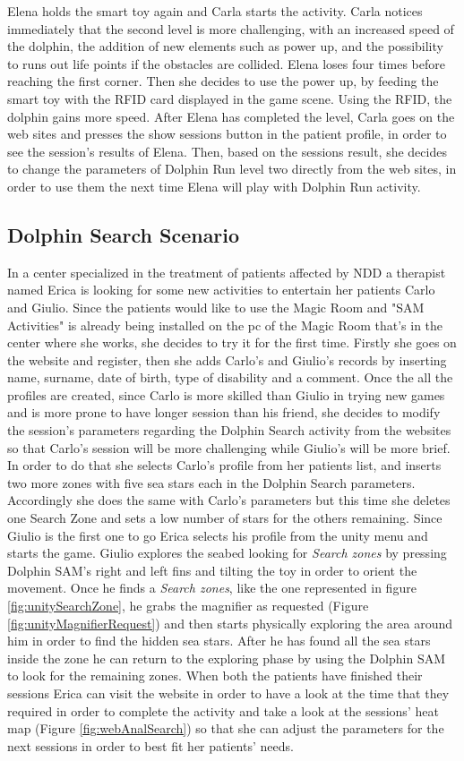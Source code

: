 Elena holds the smart toy again and Carla starts the activity. Carla notices immediately that the second level is more challenging, with an increased speed of the dolphin, the addition of new elements such as power up, and the possibility to runs out life points if the obstacles are collided. Elena loses four times before reaching the first corner. Then she decides to use the power up, by feeding the smart toy with the RFID card displayed in the game scene. Using the RFID, the dolphin gains more speed.
After Elena has completed the level, Carla goes on the web sites and presses the show sessions button in the patient profile, in order to see the session's results of Elena. Then, based on the sessions result, she decides to change the parameters of Dolphin Run level two directly from the web sites, in order to use them the next time Elena will play with Dolphin Run activity.

\subsection{Dolphin Search Scenario}
In a center specialized in the treatment of patients affected by NDD a therapist named Erica is looking for some new activities to entertain her patients Carlo and Giulio.
Since the patients would like to use the Magic Room and "SAM Activities" is already being installed on the pc of the Magic Room that's in the center where she works, she decides to try it for the first time.
Firstly she goes on the website and register, then she adds Carlo's and Giulio's records by inserting name, surname, date of birth, type of disability and a comment.
Once the all the profiles are created, since Carlo is more skilled than Giulio in trying new games and is more prone to have longer session than his friend, she decides to modify the session's parameters regarding the Dolphin Search activity from the websites so that Carlo's session will be more challenging while Giulio's will be more brief. In order to do that she selects Carlo's profile from her patients list, and inserts two more zones with five sea stars each in the Dolphin Search parameters. Accordingly she does the same with Carlo's parameters but this time she deletes one Search Zone and sets a low number of stars for the others remaining.
Since Giulio is the first one to go Erica selects his profile from the unity menu and starts the game.
Giulio explores the seabed looking for \textit{Search zones} by pressing Dolphin SAM's right and left fins and tilting the toy in order to orient the movement. Once he finds a \textit{Search zones}, like the one represented in figure \ref{fig:unitySearchZone}, he grabs the magnifier as requested (Figure \ref{fig:unityMagnifierRequest}) and then starts physically exploring the area around him in order to find the hidden sea stars. After he has found all the sea stars inside the zone he can return to the exploring phase by using the Dolphin SAM to look for the remaining zones.
When both the patients have finished their sessions Erica can visit the website in order to have a look at the time that they required in order to complete the activity and take a look at the sessions' heat map (Figure \ref{fig:webAnalSearch}) so that she can adjust the parameters for the next sessions in order to best fit her patients' needs.